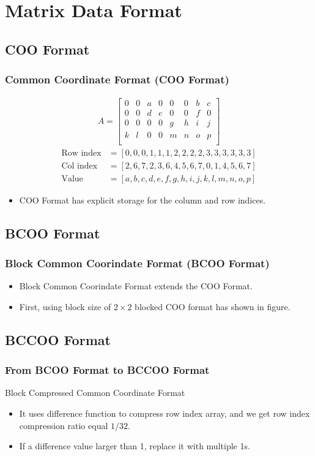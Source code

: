 \section{Matrix Data Format}

\subsection{COO Format}
\begin{frame}
    \frametitle{Common Coordinate Format (COO Format)}
	\begin{align*}
		A = \begin{bmatrix}
			0 & 0 & a & 0 & 0 & 0 & b & c \\
			0 & 0 & d & e & 0 & 0 & f & 0 \\
			0 & 0 & 0 & 0 & g & h & i & j \\
			k & l & 0 & 0 & m & n & o & p \\
		\end{bmatrix}
	\end{align*}
	\begin{align*}
		\text{Row index} &= [0, 0, 0, 1, 1, 1, 2, 2, 2, 2, 3, 3, 3, 3, 3, 3] \\
		\text{Col index} &= [2, 6, 7, 2, 3, 6, 4, 5, 6, 7, 0, 1, 4, 5, 6, 7] \\
		\text{Value}     &= [a, b, c, d, e, f, g, h, i, j, k, l, m, n, o, p]
	\end{align*}
	\begin{itemize}
		\item
    		COO Format has explicit storage for the column and row indices.
	\end{itemize}
\end{frame}

\subsection{BCOO Format}
\begin{frame}
	\frametitle{Block Common Coorindate Format (BCOO Format)}
	\begin{itemize}
		\item Block Common Coorindate Format extends the COO Format.
		\item First, using block size of $2 \times 2$ blocked COO format has 
			shown in figure.
	\end{itemize}
	
\end{frame}

\subsection{BCCOO Format}
\begin{frame}
	\frametitle{From BCOO Format to BCCOO Format}
		Block Compressed Common Coordinate Format
		\begin{itemize}
			\item It uses difference function to compress row index array, and
				we get row index compression ratio equal $1/32$.
			\item If a difference value larger than 1, replace it with multiple 1s.
		\end{itemize}
\end{frame}

